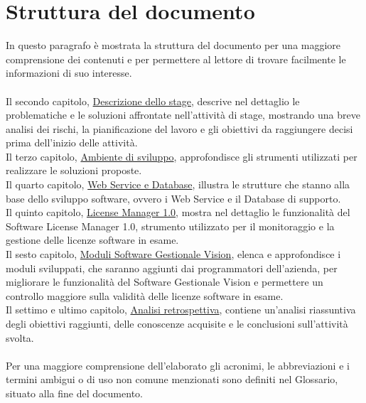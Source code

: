 \section{Struttura del documento}

In questo paragrafo è mostrata la struttura del documento per una maggiore comprensione dei contenuti e per permettere al lettore di trovare facilmente le informazioni di suo interesse.
\\
\\
Il secondo capitolo, {\hyperref[cap:descrizione-stage]{Descrizione dello stage}}, descrive nel dettaglio le problematiche e le soluzioni affrontate nell'attività di stage, mostrando una breve analisi dei rischi, la pianificazione del lavoro e gli obiettivi da raggiungere decisi prima dell'inizio delle attività.
\\
Il terzo capitolo, {\hyperref[cap:ambiente-sviluppo]{Ambiente di sviluppo}}, approfondisce gli strumenti utilizzati per realizzare le soluzioni proposte.
\\ 
Il quarto capitolo, {\hyperref[cap:sviluppo-software]{Web Service e Database}}, illustra le strutture che stanno alla base dello sviluppo software, ovvero i Web Service e il Database di supporto.
\\ 
Il quinto capitolo, {\hyperref[cap:license-manager]{License Manager 1.0}}, mostra nel dettaglio le funzionalità del Software License Manager 1.0, strumento utilizzato per il monitoraggio e la gestione delle licenze software in esame.
\\
Il sesto capitolo, {\hyperref[cap:moduli-vision]{Moduli Software Gestionale Vision}}, elenca e approfondisce i moduli sviluppati, che saranno aggiunti dai programmatori dell'azienda, per migliorare le funzionalità del Software Gestionale Vision e permettere un controllo maggiore sulla validità delle licenze software in esame.
\\  
Il settimo e ultimo capitolo, {\hyperref[cap:analisi-retrospettiva]{Analisi retrospettiva}}, contiene un'analisi riassuntiva degli obiettivi raggiunti, delle conoscenze acquisite e le conclusioni sull'attività svolta.
\\
\\
Per una maggiore comprensione dell'elaborato gli acronimi, le abbreviazioni e i termini ambigui o di uso non comune menzionati sono definiti nel Glossario, situato alla fine del documento.


